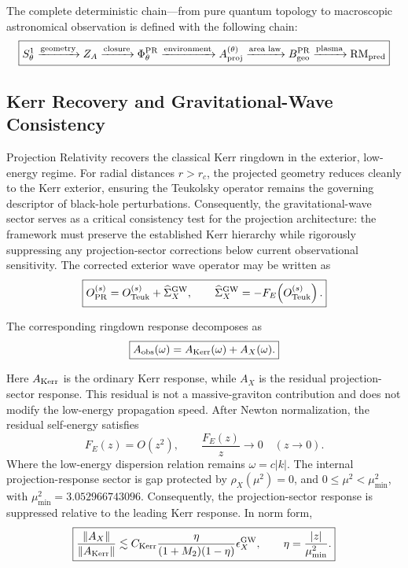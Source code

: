 \documentclass[11pt]{article}
\begin{document}
The complete deterministic chain---from pure quantum topology to macroscopic astronomical observation is defined with the following chain:
\begin{equation}
\boxed{
S^1_\theta
\xrightarrow{\text{geometry}}
Z_A
\xrightarrow{\text{closure}}
\Phi_\theta^{\rm PR}
\xrightarrow{\text{environment}}
A_{\rm proj}^{(\theta)}
\xrightarrow{\text{area law}}
B_{\rm geo}^{\rm PR}
\xrightarrow{\text{plasma}}
{\rm RM}_{\rm pred}
}
\end{equation}

\subsection{Kerr Recovery and Gravitational-Wave Consistency}
\label{sec:gw_kerr_recovery}

Projection Relativity recovers the classical Kerr ringdown in the exterior, low-energy regime. For radial distances $r > r_c$, the projected geometry reduces cleanly to the Kerr exterior, ensuring the Teukolsky operator remains the governing descriptor of black-hole perturbations. Consequently, the gravitational-wave sector serves as a critical consistency test for the projection architecture: the framework must preserve the established Kerr hierarchy while rigorously suppressing any projection-sector corrections below current observational sensitivity. The corrected exterior wave operator may be written as
\begin{equation}
\boxed{
O_{\rm PR}^{(s)}
=
O_{\rm Teuk}^{(s)}
+
\widehat{\Sigma}_{X}^{\rm GW},
\qquad
\widehat{\Sigma}_{X}^{\rm GW}
=
-F_E\!\left(O_{\rm Teuk}^{(s)}\right).
}
\end{equation}

The corresponding ringdown response decomposes as
\begin{equation}
\boxed{
A_{\rm obs}(\omega)
=
A_{\rm Kerr}(\omega)
+
A_X(\omega).
}
\end{equation}

Here \(A_{\rm Kerr}\) is the ordinary Kerr response, while \(A_X\) is the residual projection-sector response. 
This residual is not a massive-graviton contribution and does not modify the low-energy propagation speed. 
After Newton normalization, the residual self-energy satisfies
\begin{equation}
F_E(z)=O(z^2),
\qquad
\frac{F_E(z)}{z}\rightarrow0
\quad
(z\rightarrow0).
\end{equation}
Where the low-energy dispersion relation remains $\omega=c|k|$. The internal projection-response sector is gap protected by $\rho_X(\mu^2)=0$, and $0\leq\mu^2<\mu_{\min}^2$, with $\mu_{\min}^2=3.052966743096$. Consequently, the projection-sector response is suppressed relative to the leading Kerr response. 
In norm form,
\begin{equation}
\boxed{
\frac{\|A_X\|}{\|A_{\rm Kerr}\|}
\lesssim
C_{\rm Kerr}
\frac{\eta}{(1+M_2)(1-\eta)}
\epsilon_X^{\rm GW},
\qquad
\eta=\frac{|z|}{\mu_{\min}^2}.
}
\end{equation}
\end{document}
